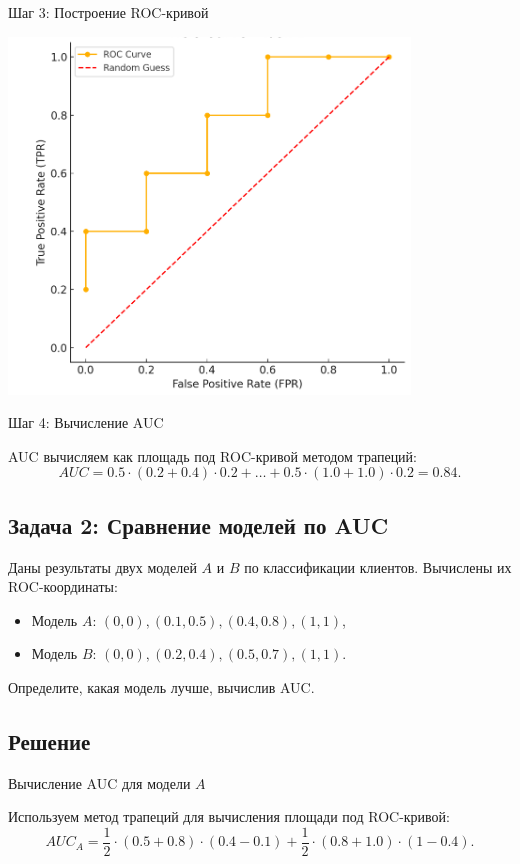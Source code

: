 Шаг 3: Построение ROC-кривой

\includegraphics[width=0.8\textwidth]{roc_task1.png}

Шаг 4: Вычисление AUC

AUC вычисляем как площадь под ROC-кривой методом трапеций:
\[
AUC = 0.5 \cdot (0.2 + 0.4) \cdot 0.2 + \dots + 0.5 \cdot (1.0 + 1.0) \cdot 0.2 = 0.84.
\]

\subsection*{Задача 2: Сравнение моделей по AUC}

Даны результаты двух моделей \(A\) и \(B\) по классификации клиентов. Вычислены их ROC-координаты:

\begin{itemize}
    \item Модель \(A\): \((0, 0), (0.1, 0.5), (0.4, 0.8), (1, 1)\),
    \item Модель \(B\): \((0, 0), (0.2, 0.4), (0.5, 0.7), (1, 1)\).
\end{itemize}

Определите, какая модель лучше, вычислив AUC.

\subsection*{Решение}

Вычисление AUC для модели \(A\)

Используем метод трапеций для вычисления площади под ROC-кривой:
\[
AUC_A = \frac{1}{2} \cdot (0.5 + 0.8) \cdot (0.4 - 0.1) + \frac{1}{2} \cdot (0.8 + 1.0) \cdot (1 - 0.4).
\]

